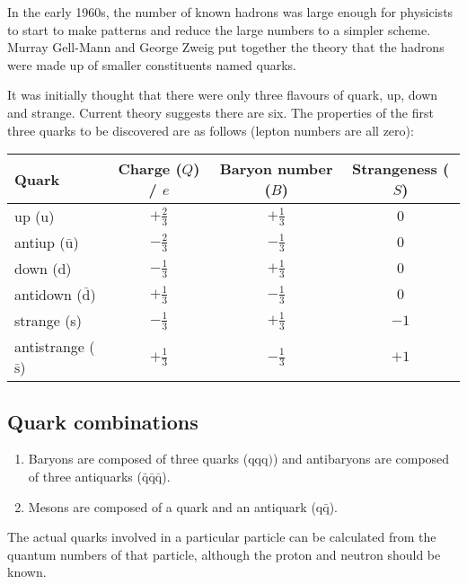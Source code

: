 \documentclass[a4paper,12pt]{article}
\begin{document}
In the early 1960s, the number of known hadrons was large enough for physicists to start to make patterns and reduce the large numbers to a simpler scheme.  Murray Gell-Mann and George Zweig put together the theory that the hadrons were made up of smaller constituents named quarks.

It was initially thought that there were only three flavours of quark, up, down and strange.  Current theory suggests there are six.  The properties of the first three quarks to be discovered are as follows (lepton numbers are all zero):

\noindent\begin{tabular}{lccc}
\hline
\hline
Quark & Charge ($Q$) / $e$ & Baryon number ($B$) & Strangeness ($S$) \\
\hline
up (u) & $+\frac{2}{3}$ & $+\frac{1}{3}$ & $0$ \\
antiup ($\bar{\mathrm{u}}$) & $-\frac{2}{3}$ & $-\frac{1}{3}$ & $0$ \\ 
down (d) & $-\frac{1}{3}$ & $+\frac{1}{3}$ & $0$ \\
antidown ($\bar{\mathrm{d}}$) & $+\frac{1}{3}$ & $-\frac{1}{3}$ & $0$ \\
strange (s) & $-\frac{1}{3}$ & $+\frac{1}{3}$ & $-1$ \\
antistrange ($\bar{\mathrm{s}}$) & $+\frac{1}{3}$ & $-\frac{1}{3}$ & $+1$ \\
\hline
\hline
\end{tabular}

\subsection{Quark combinations}

\begin{enumerate}
\item Baryons are composed of three quarks ($\mathrm{q}\mathrm{q}\mathrm{q})$) and antibaryons are composed of three antiquarks ($\bar{\mathrm{q}}\bar{\mathrm{q}}\bar{\mathrm{q}}$).
\item Mesons are composed of a quark and an antiquark ($\mathrm{q}\bar{\mathrm{q}}$).
\end{enumerate}

The actual quarks involved in a particular particle can be calculated from the quantum numbers of that particle, although the proton and neutron should be known.\\
\end{document}
